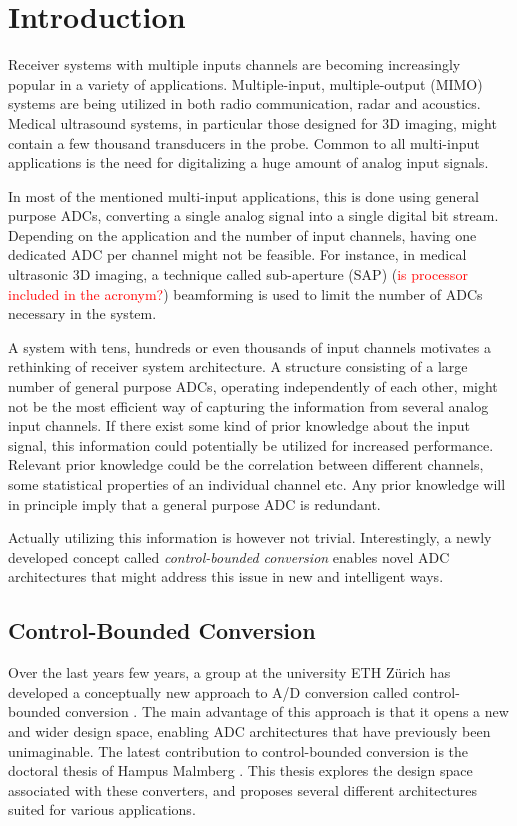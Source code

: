 \chapter{Introduction}
Receiver systems with multiple inputs channels are becoming increasingly popular in a variety of applications. Multiple-input, multiple-output (MIMO) systems are being utilized in both radio communication, radar and acoustics. Medical ultrasound systems, in particular those designed for 3D imaging, might contain a few thousand transducers in the probe. Common to all multi-input applications is the need for digitalizing a huge amount of analog input signals.

In most of the mentioned multi-input applications, this is done using general purpose ADCs, converting a single analog signal into a single digital bit stream. Depending on the application and the number of input channels, having one dedicated ADC per channel might not be feasible. For instance, in medical ultrasonic 3D imaging, a technique called sub-aperture (SAP) (\textcolor{red}{is processor included in the acronym?}) beamforming is used to limit the number of ADCs necessary in the system.

A system with tens, hundreds or even thousands of input channels motivates a rethinking of receiver system architecture. A structure consisting of a large number of general purpose ADCs, operating independently of each other, might not be the most efficient way of capturing the information from several analog input channels. If there exist some kind of prior knowledge about the input signal, this information could potentially be utilized for increased performance. Relevant prior knowledge could be the correlation between different channels, some statistical properties of an individual channel etc. Any prior knowledge will in principle imply that a general purpose ADC is redundant.

Actually utilizing this information is however not trivial. Interestingly, a newly developed concept called \textit{control-bounded conversion} enables novel ADC architectures that might address this issue in new and intelligent ways.

\section{Control-Bounded Conversion}
Over the last years few years, a group at the university ETH Zürich has developed a conceptually new approach to A/D conversion called control-bounded conversion \cite{cbc_2020_loeliger}. The main advantage of this approach is that it opens a new and wider design space, enabling ADC architectures that have previously been unimaginable. The latest contribution to control-bounded conversion is the doctoral thesis of Hampus Malmberg \cite{malmberg_thesis}. This thesis explores the design space associated with these converters, and proposes several different architectures suited for various applications.

